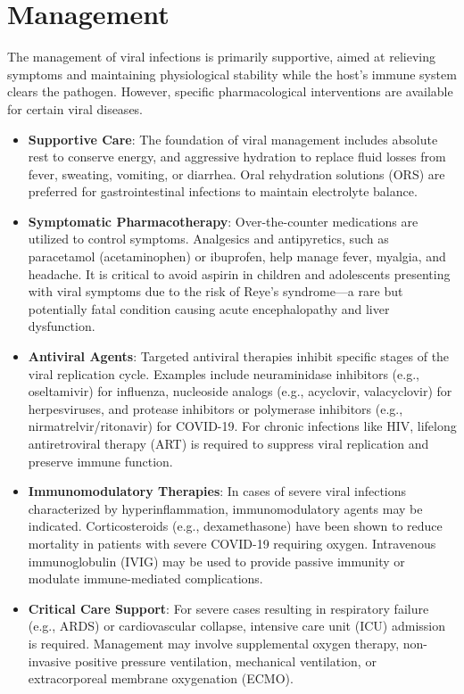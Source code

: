 \section*{Management}
The management of viral infections is primarily supportive, aimed at relieving symptoms and maintaining physiological stability while the host's immune system clears the pathogen. However, specific pharmacological interventions are available for certain viral diseases.
\begin{itemize}
    \item \textbf{Supportive Care}: The foundation of viral management includes absolute rest to conserve energy, and aggressive hydration to replace fluid losses from fever, sweating, vomiting, or diarrhea. Oral rehydration solutions (ORS) are preferred for gastrointestinal infections to maintain electrolyte balance.
    \item \textbf{Symptomatic Pharmacotherapy}: Over-the-counter medications are utilized to control symptoms. Analgesics and antipyretics, such as paracetamol (acetaminophen) or ibuprofen, help manage fever, myalgia, and headache. It is critical to avoid aspirin in children and adolescents presenting with viral symptoms due to the risk of Reye's syndrome—a rare but potentially fatal condition causing acute encephalopathy and liver dysfunction.
    \item \textbf{Antiviral Agents}: Targeted antiviral therapies inhibit specific stages of the viral replication cycle. Examples include neuraminidase inhibitors (e.g., oseltamivir) for influenza, nucleoside analogs (e.g., acyclovir, valacyclovir) for herpesviruses, and protease inhibitors or polymerase inhibitors (e.g., nirmatrelvir/ritonavir) for COVID-19. For chronic infections like HIV, lifelong antiretroviral therapy (ART) is required to suppress viral replication and preserve immune function.
    \item \textbf{Immunomodulatory Therapies}: In cases of severe viral infections characterized by hyperinflammation, immunomodulatory agents may be indicated. Corticosteroids (e.g., dexamethasone) have been shown to reduce mortality in patients with severe COVID-19 requiring oxygen. Intravenous immunoglobulin (IVIG) may be used to provide passive immunity or modulate immune-mediated complications.
    \item \textbf{Critical Care Support}: For severe cases resulting in respiratory failure (e.g., ARDS) or cardiovascular collapse, intensive care unit (ICU) admission is required. Management may involve supplemental oxygen therapy, non-invasive positive pressure ventilation, mechanical ventilation, or extracorporeal membrane oxygenation (ECMO).
\end{itemize}

